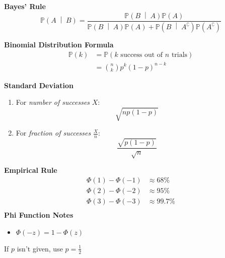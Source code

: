 \documentclass[titlepage, 12pt, leqno]{article}
\begin{document}
\setlength{\parskip}{1\baselineskip}
\setlength{\parindent}{15pt}
\newpage


\begin{multicols}{2}
\textbf{Bayes' Rule}
\[
    \mathbb{P}\left(A \;\middle|\; B\right) = \frac{ 
    \mathbb{P}\left(B \;\middle|\; A\right) \mathbb{P}(A)}{
\mathbb{P}\left(B \;\middle|\; A\right) \mathbb{P}(A) +
\mathbb{P}\left(B \;\middle|\; A^\complement \right) \mathbb{P}(A^\complement )}
\]

\textbf{Binomial Distribution Formula}
\begin{align*}
    \mathbb{P}(k) &= \mathbb{P}( k\text{ success out of } n \text{ trials}) \\
                  &= \binom{n}{k}p^k(1-p)^{n-k}
\end{align*}

\textbf{Standard Deviation}
\begin{enumerate}
    \item For \textit{number of successes} $X$:
        \[
            \sqrt{np(1-p)}
        \]
    \item For \textit{fraction of successes} $\frac{X}{n}$:
        \[
        \frac{\sqrt{p(1-p)}}{\sqrt{n}}
        \]
\end{enumerate}
\columnbreak

\textbf{Empirical Rule}
\begin{align*}
    \Phi(1) - \Phi(-1) &\approx 68\% \\
    \Phi(2) - \Phi(-2) &\approx 95\% \\
    \Phi(3) - \Phi(-3) &\approx 99.7\% \\
\end{align*}
\textbf{Phi Function Notes}
\begin{itemize}
    \item $\Phi(-z) = 1 - \Phi(z)$
\end{itemize}

\begin{note}
    If $p$ isn't given, use $p = \frac{1}{2}$
\end{note}

\end{multicols}
\end{document}
